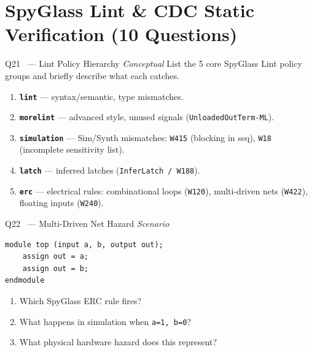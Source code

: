 \documentclass[12pt,a4paper]{article}
\newcommand{\advanced}{%
  \fbox{\textcolor{advred}{\bfseries\sffamily\small ADVANCED}}}
\newcommand{\moderate}{%
  \fbox{\textcolor{modoran}{\bfseries\sffamily\small MODERATE}}}
\begin{document}
\section{SpyGlass Lint \& CDC Static Verification (10 Questions)}
\label{sec:spyglass}

\begin{questionbox}{Q21 \moderate\ --- Lint Policy Hierarchy \hfill\textit{Conceptual}}
List the 5 core SpyGlass Lint policy groups and briefly describe what each catches.
\end{questionbox}

\begin{answerbox}
\begin{enumerate}
  \item \textbf{\texttt{lint}} --- syntax/semantic, type mismatches.
  \item \textbf{\texttt{morelint}} --- advanced style, unused signals (\texttt{UnloadedOutTerm-ML}).
  \item \textbf{\texttt{simulation}} --- Sim/Synth mismatches: \texttt{W415} (blocking in seq), \texttt{W18} (incomplete sensitivity list).
  \item \textbf{\texttt{latch}} --- inferred latches (\texttt{InferLatch / W188}).
  \item \textbf{\texttt{erc}} --- electrical rules: combinational loops (\texttt{W120}), multi-driven nets (\texttt{W422}), floating inputs (\texttt{W240}).
\end{enumerate}
\end{answerbox}

\begin{questionbox}{Q22 \advanced\ --- Multi-Driven Net Hazard \hfill\textit{Scenario}}

\begin{lstlisting}[style=verilogstyle]
module top (input a, b, output out);
    assign out = a;
    assign out = b;
endmodule
\end{lstlisting}

\begin{enumerate}[label=\textbf{\alph*)}]
  \item Which SpyGlass ERC rule fires?
  \item What happens in simulation when \texttt{a=1, b=0}?
  \item What physical hardware hazard does this represent?
\end{enumerate}
\end{questionbox}
\end{document}
